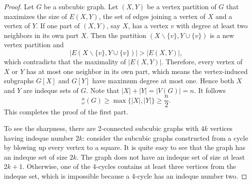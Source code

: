 \documentclass[10pt,a4paper]{amsart}
\newcommand{\idq}{{}^{\alpha}_{\omega}}
\begin{document}
\begin{proof}
    Let $G$ be a subcubic graph. Let $(X,Y)$ be a vertex partition of $G$ that maximizes the size of $E(X,Y)$, the set of edges joining a vertex of $X$ and a vertex of $Y$. If one part of $(X,Y)$, say $X$, has a vertex $v$ with degree at least two neighbors in its own part $X$. Then the partition $(X\backslash \{v\}, Y\cup \{v\})$ is a new vertex partition and 
    \[|E(X\backslash \{v\}, Y\cup \{v\})|>|E(X,Y)|,\] which contradicts that the maximality of $|E(X,Y)|$. Therefore, every vertex of $X$ or $Y$ has at most one neighbor in its own part, which means the vertex-induced subgraphs $G[X]$ and $G[Y]$ have maximum degree at most one. 
    Hence both $X$ and $Y$ are indeque sets of $G$. Note that $|X|+|Y|=|V(G)|=n$. It follows 
    \[\idq(G)\ge \max\{|X|, |Y|\}\ge \frac n 2.\]
    This completes the proof of the first part.
    
    To see the sharpness, there are 2-connected subcubic graphs with $4k$ vertices having indeque number $2k$: consider the subcubic graphs constructed from a cycle by blowing up every vertex to a square. It is quite easy to see that the graph has an indeque set of size $2k$. The graph does not have an indeque set of size at least $2k+1$. Otherwise, one of the 4-cycles contains at least three vertices from the indeque set, which is impossible because a 4-cycle has an indeque number two. 
\end{proof}
\end{document}
